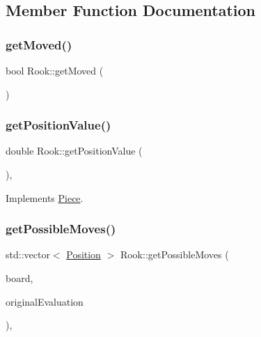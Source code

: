 \subsection{Member Function Documentation}
\mbox{\label{class_rook_a63c6d35a7f51e24d17079c80980dd948}} 
\subsubsection{\texorpdfstring{get\+Moved()}{getMoved()}}
{\footnotesize\ttfamily bool Rook\+::get\+Moved (\begin{DoxyParamCaption}{ }\end{DoxyParamCaption})}

\mbox{\label{class_rook_ab1d83e6acb838249647f1f5fa7d17f41}} 
\subsubsection{\texorpdfstring{get\+Position\+Value()}{getPositionValue()}}
{\footnotesize\ttfamily double Rook\+::get\+Position\+Value (\begin{DoxyParamCaption}{ }\end{DoxyParamCaption})\hspace{0.3cm}{\ttfamily [override]}, {\ttfamily [virtual]}}



Implements \hyperlink{class_piece_a4adfa58b4f0368c9a5859afcf294e0a4}{Piece}.

\mbox{\label{class_rook_ab186037a1f596102d618c1c9df31490d}} 
\subsubsection{\texorpdfstring{get\+Possible\+Moves()}{getPossibleMoves()}}
{\footnotesize\ttfamily std\+::vector$<$ \hyperlink{struct_position}{Position} $>$ Rook\+::get\+Possible\+Moves (\begin{DoxyParamCaption}\item[{std\+::shared\+\_\+ptr$<$ \hyperlink{class_base_board}{Base\+Board} $>$}]{board,  }\item[{bool}]{original\+Evaluation }\end{DoxyParamCaption})\hspace{0.3cm}{\ttfamily [override]}, {\ttfamily [virtual]}}



